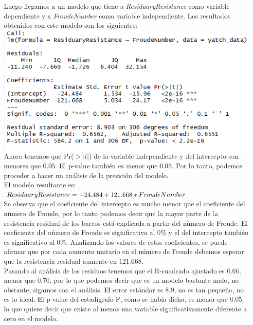 \documentclass[twoside]{article}
\begin{document}
\begin{multicols}{2}
Luego llegamos a un modelo que tiene a \textit{ResiduaryResistance} como variable dependiente y a \textit{FroudeNumber} como variable independiente. Los resultados obtenidos con este modelo son los siguientes:\\

\includegraphics[scale = 0.4]{images/pic_03.png} \\

Ahora tenemos que Pr($>|t|$) de la variable independiente y del intercepto son menores que $0.05$. El p-value tambi\'en es menor que $0.05$. Por lo tanto, podemos proceder a hacer un an\'alisis de la presici\'on del modelo.\\
El modelo resultante es:\\

$\hat{ResiduaryResistance} = -24.484 + \\ 121.668 * FroudeNumber$\\

Se observa que el coeficiente del intercepto es mucho menor que el coeficiente del n\'umero de Froude, por lo tanto podemos decir que la mayor parte de la resistencia residual de los barcos est\'a explicada a partir del n\'umero de Froude. El coeficiente del n\'umero de Froude es significativo al $0\%$ y el del intercepto tambi\'en es significativo al $0\%$. Analizando los valores de estos coeficientes, se puede afirmar que por cada aumento unitario en el n\'umero de Froude debemos esperar que la resistencia residual aumente en $121.668$. \\

Pasando al an\'alisis de los residuos tenemos que el R-cuadrado ajustado es $0.66$, menor que $0.70$, por lo que podemos decir que  es un modelo bastante malo, no obstante, sigamos con el an\'alisis. El error est\'andar es $8.9$, no es tan peque\~no, no es lo ideal. El p-value del estad\'igrafo F, como se hab\'ia dicho, es menor que $0.05$, lo que quiere decir que existe al menos una variable significativamente diferente a cero en el modelo.\\


\end{multicols}
\end{document}
